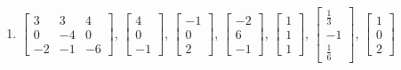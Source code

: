 \begin{exercise}
\begin{enumerate}
\item \(\begin{bmatrix} 3&3&4\\0&-4&0\\-2&-1&-6 \end{bmatrix}\),\quad
\(\begin{bmatrix}4\\0\\-1\end{bmatrix}\), \(\begin{bmatrix}-1\\0\\2\end{bmatrix}\), \(\begin{bmatrix}-2\\6\\-1\end{bmatrix}\), \(\begin{bmatrix}1\\1\\1\end{bmatrix}\), \(\begin{bmatrix}\frac13\\-1\\\frac16\end{bmatrix}\), \(\begin{bmatrix}1\\0\\2\end{bmatrix}\)


\end{enumerate}
\end{exercise}
